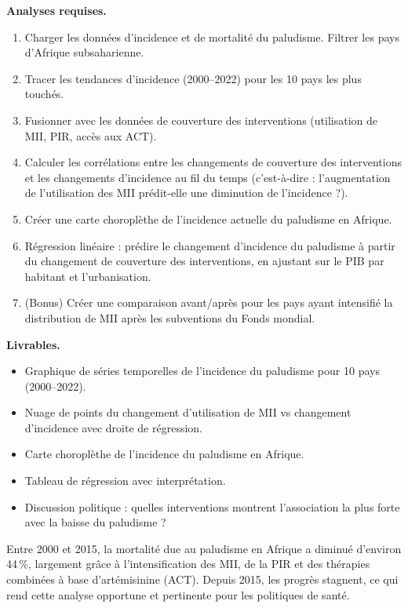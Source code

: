 \textbf{Analyses requises.}
\begin{enumerate}
  \item Charger les donn\'ees d'incidence et de mortalit\'e du paludisme. Filtrer les pays d'Afrique subsaharienne.
  \item Tracer les tendances d'incidence (2000--2022) pour les 10 pays les plus touch\'es.
  \item Fusionner avec les donn\'ees de couverture des interventions (utilisation de MII, PIR, acc\`es aux ACT).
  \item Calculer les corr\'elations entre les changements de couverture des interventions et les changements d'incidence au fil du temps (c'est-\`a-dire : l'augmentation de l'utilisation des MII pr\'edit-elle une diminution de l'incidence ?).
  \item Cr\'eer une carte choropl\`ethe de l'incidence actuelle du paludisme en Afrique.
  \item R\'egression lin\'eaire : pr\'edire le changement d'incidence du paludisme \`a partir du changement de couverture des interventions, en ajustant sur le PIB par habitant et l'urbanisation.
  \item (Bonus) Cr\'eer une comparaison avant/apr\`es pour les pays ayant intensifi\'e la distribution de MII apr\`es les subventions du Fonds mondial.
\end{enumerate}

\textbf{Livrables.}
\begin{itemize}
  \item Graphique de s\'eries temporelles de l'incidence du paludisme pour 10 pays (2000--2022).
  \item Nuage de points du changement d'utilisation de MII vs changement d'incidence avec droite de r\'egression.
  \item Carte choropl\`ethe de l'incidence du paludisme en Afrique.
  \item Tableau de r\'egression avec interpr\'etation.
  \item Discussion politique : quelles interventions montrent l'association la plus forte avec la baisse du paludisme ?
\end{itemize}

\begin{clinicalnote}
Entre 2000 et 2015, la mortalit\'e due au paludisme en Afrique a diminu\'e d'environ 44\,\%, largement gr\^ace \`a l'intensification des MII, de la PIR et des th\'erapies combin\'ees \`a base d'art\'emisinine (ACT). Depuis 2015, les progr\`es stagnent, ce qui rend cette analyse opportune et pertinente pour les politiques de sant\'e.
\end{clinicalnote}

